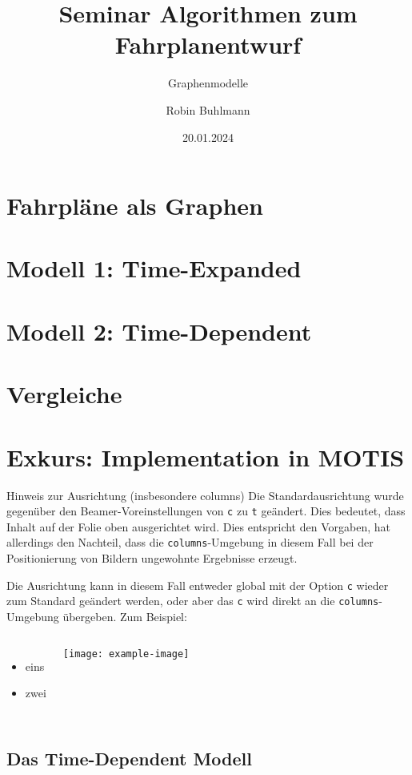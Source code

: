 \documentclass[
	ngerman,
	aspectratio=43,
	color={accentcolor=11c},
	logo=false,
	colorframetitle=false,
	]{tudabeamer}
\title{Seminar Algorithmen zum Fahrplanentwurf}
\subtitle{Graphenmodelle}
\author[R. Buhlmann]{Robin Buhlmann}
\date{20.01.2024}
\let\code\texttt
\begin{document}
\maketitle

\section{Fahrpläne als Graphen}


\section{Modell 1: Time-Expanded}


\section{Modell 2: Time-Dependent}


\section{Vergleiche}


\section{Exkurs: Implementation in MOTIS}




\begin{frame}{Hinweis zur Ausrichtung (insbesondere columns)}
	Die Standardausrichtung wurde gegenüber den Beamer-Voreinstellungen von \code{c} zu \code{t} geändert. Dies bedeutet, dass Inhalt auf der Folie oben ausgerichtet wird. Dies entspricht den Vorgaben, hat allerdings den Nachteil, dass die \code{columns}-Umgebung in diesem Fall bei der Positionierung von Bildern ungewohnte Ergebnisse erzeugt.

	Die Ausrichtung kann in diesem Fall entweder global mit der Option \code{c} wieder zum Standard geändert werden, oder aber das \code{c} wird direkt an die \code{columns}-Umgebung übergeben. Zum Beispiel:
\begin{columns}[onlytextwidth,c]%
	\begin{itemize}
		\item eins
		\item zwei
	\end{itemize}
	\texttt{[image: example-image]}
\end{columns}
\end{frame}

\subsection{Das Time-Dependent Modell}
\end{document}
